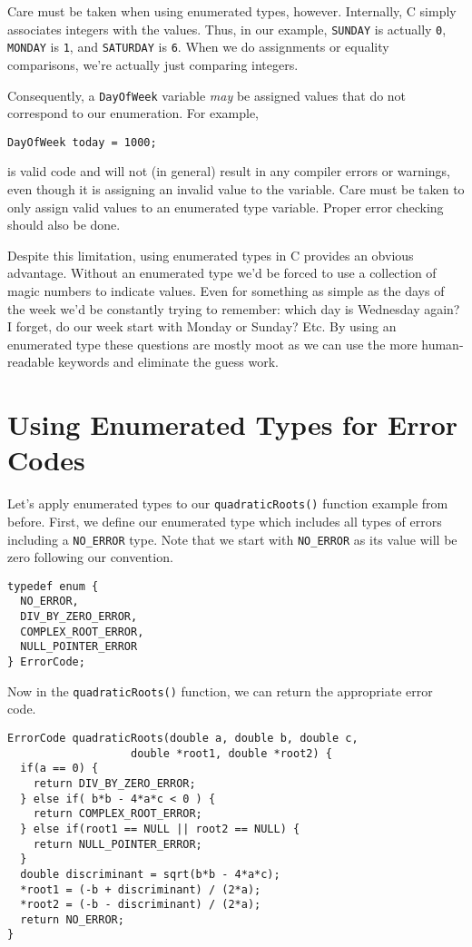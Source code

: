 Care must be taken when using enumerated types, however.  
Internally, C simply associates integers with the values.  Thus, 
in our example, \texttt{SUNDAY} is actually \texttt{0}, 
\texttt{MONDAY} is \texttt{1}, and 
\texttt{SATURDAY} is \texttt{6}.  When we do
assignments or equality comparisons, we're actually just
comparing integers.  

Consequently, a \texttt{DayOfWeek} variable \emph{may}
be assigned values that do not correspond to our enumeration. 
For example, 

\texttt{DayOfWeek today = 1000;}

is valid code and will not (in general) result in any compiler errors
or warnings, even though it is assigning an invalid value to the 
variable.  Care must be taken to only assign valid values to an
enumerated type variable.  Proper error checking should also
be done.

Despite this limitation, using enumerated types in C provides an
obvious advantage.  Without an enumerated type we'd be forced
to use a collection of \glspl{magic number} to indicate values.  
Even for something as simple as the days of the week we'd be
constantly trying to remember: which day is Wednesday again?
I forget, do our week start with Monday or Sunday?  Etc.  By
using an enumerated type these questions are mostly moot as
we can use the more human-readable keywords and eliminate
the guess work.

\section{Using Enumerated Types for Error Codes}

Let's apply enumerated types to our \texttt{quadraticRoots()}
function example from before.  First, we define our enumerated
type which includes all types of errors including a \texttt{NO_ERROR}
type.  Note that we start with \texttt{NO_ERROR} as its value
will be zero following our convention.

\begin{verbatim}
typedef enum {
  NO_ERROR,
  DIV_BY_ZERO_ERROR,
  COMPLEX_ROOT_ERROR,
  NULL_POINTER_ERROR
} ErrorCode;
\end{verbatim}

Now in the \texttt{quadraticRoots()} function, we can
return the appropriate error code.

\begin{verbatim}
ErrorCode quadraticRoots(double a, double b, double c, 
                   double *root1, double *root2) {
  if(a == 0) {
    return DIV_BY_ZERO_ERROR;
  } else if( b*b - 4*a*c < 0 ) {
    return COMPLEX_ROOT_ERROR;
  } else if(root1 == NULL || root2 == NULL) {
    return NULL_POINTER_ERROR;
  }
  double discriminant = sqrt(b*b - 4*a*c);
  *root1 = (-b + discriminant) / (2*a);
  *root2 = (-b - discriminant) / (2*a);
  return NO_ERROR;
}
\end{verbatim}

